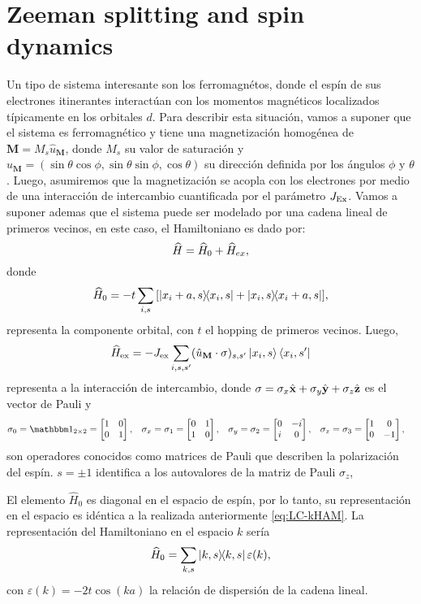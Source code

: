 \section{Zeeman splitting and spin dynamics}

Un tipo de sistema interesante son los ferromagnétos, donde el espín de sus electrones itinerantes interactúan con los momentos  magnéticos localizados típicamente en los orbitales $d$. Para describir esta situación, vamos a suponer que el sistema es ferromagnético y tiene una magnetización homogénea de $\textbf{M}=M_s\hat{u}_{\textbf{M}}$, donde $M_s$ su valor de saturación y $\hat{u}_{\textbf{M}}=(\sin\theta\cos\phi,\sin\theta\sin\phi,\cos\theta)$ su dirección definida por los ángulos $\phi$ y $\theta$. Luego, asumiremos que la magnetización se acopla con los electrones por medio de una interacción de intercambio cuantificada por el parámetro $J_{\rm Ex }$. Vamos a suponer ademas que el sistema puede ser modelado por una cadena lineal de primeros vecinos, en este caso, el Hamiltoniano es dado por:
\begin{equation}{\label{eq:lc_HAM_Zeeman}}
	\widehat{H} = \widehat{H}_0+\widehat{H}_{ex},
\end{equation}
donde
\begin{equation}
	\widehat{H}_0 =- t  \sum_{i,s} \bqty{\ketbra{x_i + a,s}{x_i,s} + \ketbra{x_i,s}{x_i + a,s}},
\end{equation}
representa la componente orbital, con $t$ el hopping de primeros vecinos. Luego, 
\begin{equation}
	\widehat{H}_{\rm ex} =-J_{\rm ex }  \sum_{i,s,s'} (\hat{u}_{\textbf{M}}\cdot \vb{\sigma})_{s,s'}\ket{x_i,s}\bra{x_i,s'} 
\end{equation}
representa a la interacción de intercambio, donde $ \vb{\sigma}=\sigma_x \hat{\vb x} + \sigma_y \hat{\vb y} + \sigma_z \hat{\vb z} $ es el vector de Pauli y 
\begin{align*}
	\sigma_0 = \mathbbm1_{2\times2}&= \bmqty{\pmat{0}}, & \sigma_x = \sigma_1 &= \bmqty{\pmat{x}}, & \sigma_y = \sigma_2 &= \bmqty{\pmat{y}}, & \sigma_z = \sigma_3 &= \bmqty{\pmat{z}},
\end{align*}
son operadores conocidos como matrices de Pauli que describen la polarización del espín. $s=\pm 1$ identifica a los autovalores de la matriz de Pauli $\sigma_z$, 

El elemento  $\widehat{H}_0$ es diagonal en el espacio de espín, por lo tanto, su representación en el espacio es idéntica a la realizada anteriormente \eqref{eq:LC-kHAM}.
La representación del Hamiltoniano en el espacio $k$ sería
\begin{align*}
	\widehat{H}_0 = \sum_{k, s} \ketbra{k, s} \varepsilon(k) ,
\end{align*}
con $\varepsilon(k)= -2t \cos(ka) $ la relación de dispersión de la cadena lineal.

